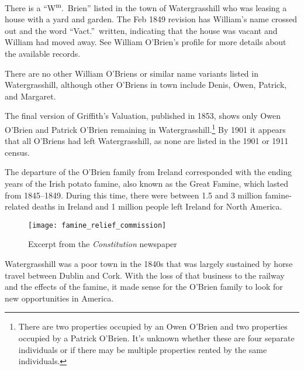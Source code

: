 {{There is a ``W\textsuperscript{m}.\ Brien'' listed in the town of Watergrasshill who was leasing a house with a yard and garden.\cite{Valuation1849:1} The Feb 1849 revision has William's name crossed out and the word ``Vact.''\ written, indicating that the house was vacant and William had moved away.\cite{House1849} See William O'Brien's profile for more details about the available records.

There are no other William O'Briens or similar name variants listed in Watergrasshill, although other O'Briens in town include Denis,\cite{Valuation1849:2} Owen,\cite{Valuation1849:3} Patrick,\cite{Valuation1849:4} and Margaret.\cite{Valuation1849:5}

The final version of Griffith's Valuation, published in 1853, shows only Owen O'Brien\cite{Griffiths:46,Griffiths:90:1} and Patrick O'Brien\cite{Griffiths:90:2} remaining in Watergrasshill.\footnote{There are two properties occupied by an Owen O'Brien and two properties occupied by a Patrick O'Brien. It's unknown whether these are four separate individuals or if there may be multiple properties rented by the same individuals.} By 1901 it appears that all O'Briens had left Watergrasshill, as none are listed in the 1901 or 1911 census.\cite{1901IrishCensus,1911IrishCensus}

The departure of the O'Brien family from Ireland corresponded with the ending years of the Irish potato famine, also known as the Great Famine, which lasted from 1845--1849. During this time, there were between 1.5 and 3 million famine-related deaths in Ireland and 1 million people left Ireland for North America.\cite{Smith:469}

\begin{figure}
	\centering
	\texttt{[image: famine\_relief\_commission]}
	\caption{Excerpt from the \textit{Constitution} newspaper}
	\label{fig:FamineRelief}
\end{figure}

Watergrasshill was a poor town in the 1840s that was largely sustained by horse travel between Dublin and Cork. With the loss of that business to the railway and the effects of the famine, it made sense for the O'Brien family to look for new opportunities in America.

}}
